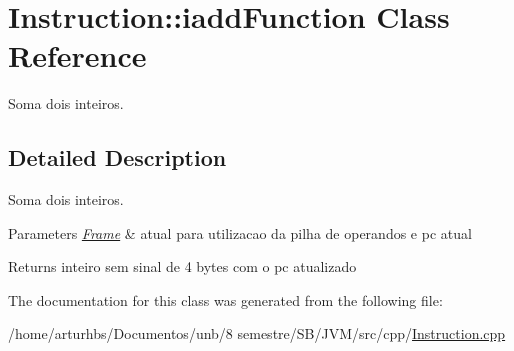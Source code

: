 \hypertarget{classInstruction_1_1iaddFunction}{}\section{Instruction\+:\+:iadd\+Function Class Reference}
\label{classInstruction_1_1iaddFunction}


Soma dois inteiros.  




\subsection{Detailed Description}
Soma dois inteiros. 


\begin{DoxyParams}{Parameters}
{\em \hyperlink{classFrame}{Frame}} & atual para utilizacao da pilha de operandos e pc atual \\
\hline
\end{DoxyParams}
\begin{DoxyReturn}{Returns}
inteiro sem sinal de 4 bytes com o pc atualizado 
\end{DoxyReturn}


The documentation for this class was generated from the following file\+:\begin{DoxyCompactItemize}
\item 
/home/arturhbs/\+Documentos/unb/8 semestre/\+S\+B/\+J\+V\+M/src/cpp/\hyperlink{Instruction_8cpp}{Instruction.\+cpp}\end{DoxyCompactItemize}
